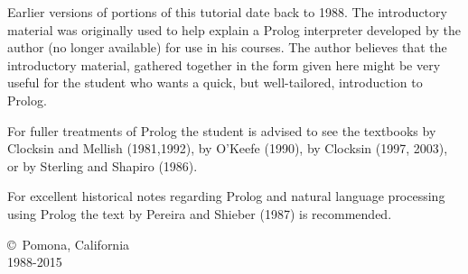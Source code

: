 Earlier versions of portions of this tutorial date back to 1988. The
introductory material was originally used to help explain a Prolog interpreter
developed by the author (no longer available) for use in his courses. The author
believes that the introductory material, gathered together in the form given
here might be very useful for the student who wants a quick, but well-tailored,
introduction to Prolog.

For fuller treatments of Prolog the student is advised to see the textbooks by
Clocksin and Mellish (1981,1992), by O'Keefe (1990), by Clocksin (1997, 2003),
or by Sterling and Shapiro (1986).

For excellent historical notes regarding Prolog and natural language processing
using Prolog the text by Pereira and Shieber (1987) is recommended.

\copyright\ Pomona, California\\ 1988-2015
